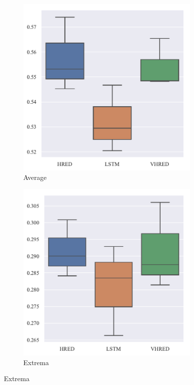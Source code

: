 \begin{figure}[H]
    \begin{subfigure}{0.5\linewidth}
        \includegraphics[width=0.8\linewidth]{figure/boxplot/model/embedding_based_vector_average/plot.pdf}
        \centering
        \caption{Average}
    \end{subfigure}%
    \begin{subfigure}{0.5\linewidth}
        \includegraphics[width=0.8\linewidth]{figure/boxplot/model/embedding_based_vector_extrema/plot.pdf}
        \centering
        \caption{Extrema}
    \end{subfigure}

\end{figure}
